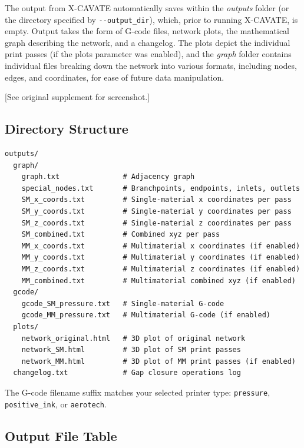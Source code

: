 \documentclass[11pt,letterpaper]{article}
\newcommand{\code}[1]{\texttt{#1}}
\begin{document}
The output from X-CAVATE automatically saves within the \textit{outputs}
folder (or the directory specified by \code{-{}-output\_dir}), which, prior to running X-CAVATE,
is empty. Output takes the form of G-code files, network plots, the
mathematical graph describing the network, and a changelog. The plots depict
the individual print passes (if the plots parameter was enabled), and the
\textit{graph} folder contains individual files breaking down the network into
various formats, including nodes, edges, and coordinates, for ease of future
data manipulation.

[See original supplement for screenshot.]

\subsection{Directory Structure}

\begin{lstlisting}
outputs/
  graph/
    graph.txt               # Adjacency graph
    special_nodes.txt       # Branchpoints, endpoints, inlets, outlets
    SM_x_coords.txt         # Single-material x coordinates per pass
    SM_y_coords.txt         # Single-material y coordinates per pass
    SM_z_coords.txt         # Single-material z coordinates per pass
    SM_combined.txt         # Combined xyz per pass
    MM_x_coords.txt         # Multimaterial x coordinates (if enabled)
    MM_y_coords.txt         # Multimaterial y coordinates (if enabled)
    MM_z_coords.txt         # Multimaterial z coordinates (if enabled)
    MM_combined.txt         # Multimaterial combined xyz (if enabled)
  gcode/
    gcode_SM_pressure.txt   # Single-material G-code
    gcode_MM_pressure.txt   # Multimaterial G-code (if enabled)
  plots/
    network_original.html   # 3D plot of original network
    network_SM.html         # 3D plot of SM print passes
    network_MM.html         # 3D plot of MM print passes (if enabled)
  changelog.txt             # Gap closure operations log
\end{lstlisting}

\begin{infobox}
The G-code filename suffix matches your selected printer type:
\code{pressure}, \code{positive\_ink}, or \code{aerotech}.
\end{infobox}

\subsection{Output File Table}
\end{document}
